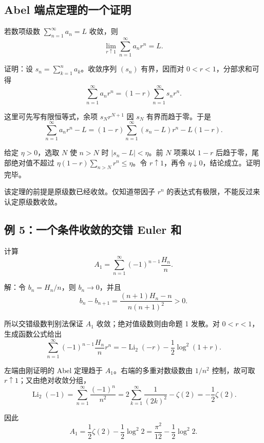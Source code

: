 \documentclass[11pt,a4paper]{article}
\newenvironment{proofblock}{\par\Needspace{4\baselineskip}\noindent}{\par}
\begin{document}
\hypertarget{sec-6-1}{%
\subsection{Abel 端点定理的一个证明}\label{sec-6-1}}

若数项级数 \(\sum_{n=1}^{\infty}a_n=L\) 收敛，则
\[
\lim_{r\uparrow1}\sum_{n=1}^{\infty}a_nr^n=L.
\]

\begin{proofblock}

证明：设 \(s_n=\sum_{k=1}^{n}a_k\)。收敛序列 \((s_n)\) 有界，因而对 \(0<r<1\)，分部求和可得
\[
\sum_{n=1}^{\infty}a_nr^n
=(1-r)\sum_{n=1}^{\infty}s_nr^n.
\]

这里可先写有限恒等式，余项 \(s_Nr^{N+1}\) 因 \(s_N\) 有界而趋于零。于是
\[
\sum_{n=1}^{\infty}a_nr^n-L
=(1-r)\sum_{n=1}^{\infty}(s_n-L)r^n-L(1-r).
\]

给定 \(\eta>0\)，选取 \(N\) 使 \(n>N\) 时 \(|s_n-L|<\eta\)。前 \(N\) 项乘以 \(1-r\) 后趋于零，尾部绝对值不超过 \(\eta(1-r)\sum_{n>N}r^n\leqslant\eta\)。令 \(r\uparrow1\)，再令 \(\eta\downarrow0\)，结论成立。证明完毕。

\end{proofblock}

该定理的前提是原级数已经收敛。仅知道带因子 \(r^n\) 的表达式有极限，不能反过来认定原级数收敛。

\hypertarget{sec-6-2}{%
\subsection{例 5：一个条件收敛的交错 Euler 和}\label{sec-6-2}}

计算
\[
A_1=\sum_{n=1}^{\infty}(-1)^{n-1}\frac{H_n}{n}.
\]

\noindent

解：令 \(b_n=H_n/n\)，则 \(b_n\to0\)，并且
\[
b_n-b_{n+1}
=\frac{(n+1)H_n-n}{n(n+1)^2}>0.
\]

所以交错级数判别法保证 \(A_1\) 收敛；绝对值级数则由命题 1 发散。对 \(0<r<1\)，生成函数公式给出
\[
\sum_{n=1}^{\infty}(-1)^{n-1}\frac{H_n}{n}r^n
=-\operatorname{Li}_2(-r)-\frac12\log^2(1+r).
\]

左端由刚证明的 Abel 定理趋于 \(A_1\)。右端的多重对数级数由 \(1/n^2\) 控制，故可取 \(r\uparrow1\)；又由绝对收敛分组，
\[
\operatorname{Li}_2(-1)
=\sum_{n=1}^{\infty}\frac{(-1)^n}{n^2}
=2\sum_{k=1}^{\infty}\frac1{(2k)^2}-\zeta(2)
=-\frac12\zeta(2).
\]

因此
\[
A_1=\frac12\zeta(2)-\frac12\log^2 2
=\frac{\pi^2}{12}-\frac12\log^2 2.
\]
\end{document}
